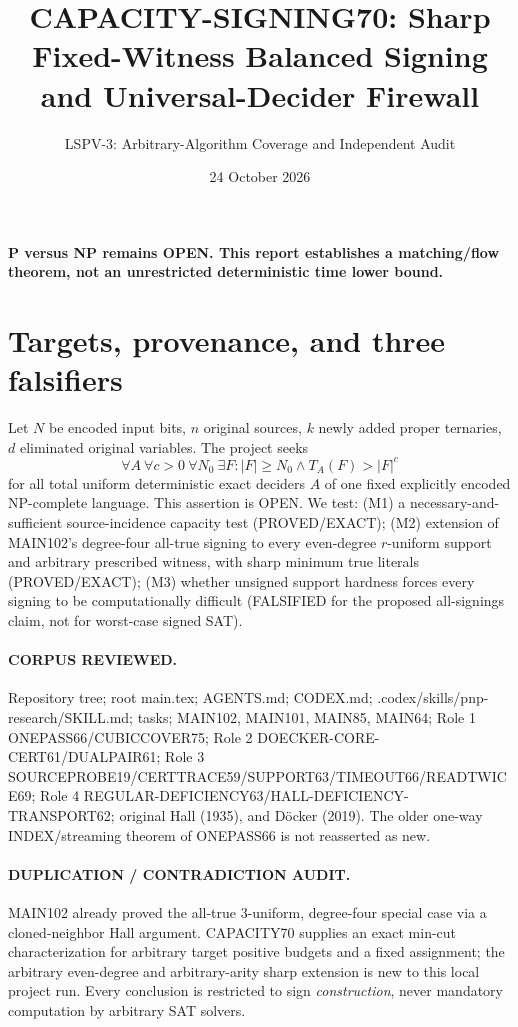 \documentclass[11pt]{article}
\title{CAPACITY-SIGNING70: Sharp Fixed-Witness Balanced Signing and Universal-Decider Firewall}
\author{LSPV-3: Arbitrary-Algorithm Coverage and Independent Audit}
\date{24 October 2026}
\begin{document}
\maketitle
\begin{center}\textbf{P versus NP remains OPEN. This report establishes a matching/flow theorem, not an unrestricted deterministic time lower bound.}\end{center}
\section{Targets, provenance, and three falsifiers}
Let $N$ be encoded input bits, $n$ original sources, $k$ newly added proper ternaries, $d$ eliminated original variables. The project seeks
\[
\forall A\ \forall c>0\ \forall N_0\ \exists F:
|F|\ge N_0\land T_A(F)>|F|^c
\]
for all total uniform deterministic exact deciders $A$ of one fixed explicitly encoded NP-complete language. This assertion is OPEN. We test: (M1) a necessary-and-sufficient source-incidence capacity test (PROVED/EXACT); (M2) extension of MAIN102's degree-four all-true signing to every even-degree $r$-uniform support and arbitrary prescribed witness, with sharp minimum true literals (PROVED/EXACT); (M3) whether unsigned support hardness forces every signing to be computationally difficult (FALSIFIED for the proposed all-signings claim, not for worst-case signed SAT).
\paragraph{CORPUS REVIEWED.} Repository tree; root main.tex; AGENTS.md; CODEX.md; .codex/skills/pnp-research/SKILL.md; tasks; MAIN102, MAIN101, MAIN85, MAIN64; Role 1 ONEPASS66/CUBICCOVER75; Role 2 DOECKER-CORE-CERT61/DUALPAIR61; Role 3 SOURCEPROBE19/CERTTRACE59/SUPPORT63/TIMEOUT66/READTWICE69; Role 4 REGULAR-DEFICIENCY63/HALL-DEFICIENCY-TRANSPORT62; original Hall (1935), and D\"ocker (2019). The older one-way INDEX/streaming theorem of ONEPASS66 is not reasserted as new.
\paragraph{DUPLICATION / CONTRADICTION AUDIT.} MAIN102 already proved the all-true 3-uniform, degree-four special case via a cloned-neighbor Hall argument. CAPACITY70 supplies an exact min-cut characterization for arbitrary target positive budgets and a fixed assignment; the arbitrary even-degree and arbitrary-arity sharp extension is new to this local project run. Every conclusion is restricted to sign \emph{construction}, never mandatory computation by arbitrary SAT solvers.
\end{document}
